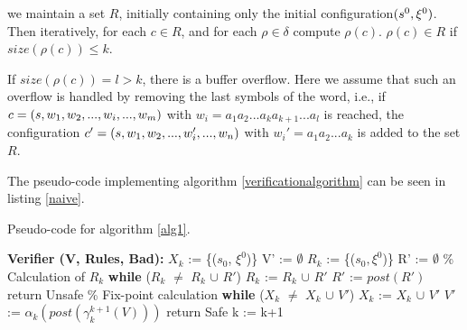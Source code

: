 we maintain a set $R$, initially containing only the initial configuration$(s^0, \xi^0)$. Then iteratively, for each $c \in R$, and for each $\rho \in \delta$ compute $\rho(c)$. $\rho(c) \in R$ if  $size(\rho(c)) \leq k$.

If $size(\rho(c)) = l > k$, there is a buffer overflow. Here we assume that such an overflow is handled by removing the last symbols of the word, i.e., if $c = (s, w_1, w_2,..., w_i, ...,  w_m)$ with $w_i = a_1a_2...a_ka_{k+1}...a_l$ is reached, the configuration $c' = (s, w_1, w_2, ..., w_i', ..., w_n)$ with $w_i' = a_1a_2...a_k$ is added to the set $R$.

The pseudo-code implementing algorithm \ref{verificationalgorithm} can be seen in listing \ref{naive}. 

\begin{algorithm}
  \caption{Pseudo-code for algorithm \ref{alg1}.}
	\label{naive}
  \begin{algorithmic}[1]
    \State \textbf{Verifier (V, Rules, Bad):}
	\State $X_k$ := \{($s_0$, $\xi^0$)\}
	\State V' := $\emptyset$
	\State $R_k$ := \{($s_0, \xi^0$)\}
	\State R' := $\emptyset$
	\State \% Calculation of $R_k$
	\State\textbf{while} ($R_k$ $\neq$ $R_k$ $\cup$ $R'$)
	\State \hspace{10pt} $R_k$ := $R_k$ $\cup$ $R'$
        \State \hspace{10pt} $R'$ := $post(R')$
        \State return Unsafe
        \EndIf 
	\State 
	\State \% Fix-point calculation
	\State\textbf{while} ($X_k$ $\neq$ $X_k$ $\cup$ $V'$)
	\State \hspace{10pt} $X_k$ := $X_k$ $\cup$ $V'$
        \State \hspace{10pt} $V'$ := $\alpha_k(post(\gamma_k^{k+1}(V)))$
         
        \State return Safe
        \EndIf
        \State k := k+1
      \EndFor
\end{algorithmic}
\end{algorithm}

